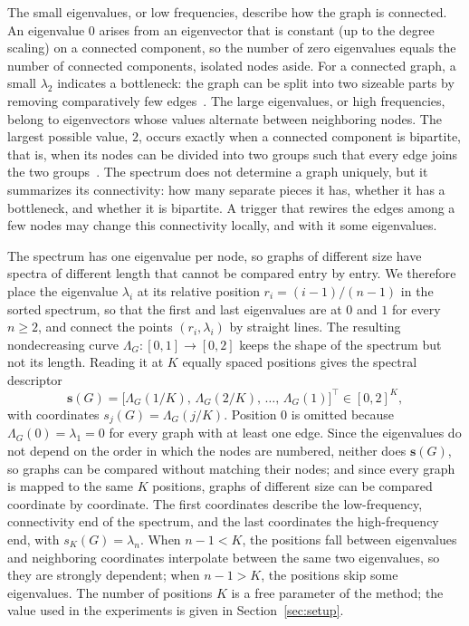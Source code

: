 \documentclass[journal]{IEEEtran}
\newcommand{\bs}{\mathbf{s}}            %
\begin{document}
The small eigenvalues, or low frequencies,
describe how the graph is connected. An eigenvalue $0$ arises from an
eigenvector that is constant (up to the degree scaling) on a connected
component, so the number of zero eigenvalues equals the number of connected
components, isolated nodes aside. For a connected graph, a small $\lambda_2$
indicates a bottleneck: the graph can be split into two sizeable parts by
removing comparatively few edges~\cite{chung1997spectral}. The large
eigenvalues, or high frequencies, belong to eigenvectors whose values alternate
between neighboring nodes. The largest possible value, $2$, occurs exactly when
a connected component is bipartite, that is, when its nodes can be divided into
two groups such that every edge joins the two
groups~\cite{chung1997spectral}. The spectrum does not determine a graph
uniquely, but it summarizes its connectivity: how many separate pieces it has,
whether it has a bottleneck, and whether it is bipartite. A trigger that
rewires the edges among a few nodes may change this connectivity locally, and
with it some eigenvalues.

The spectrum has one eigenvalue per node, so
graphs of different size have spectra of different length that cannot be
compared entry by entry. We therefore place the eigenvalue $\lambda_i$ at its
relative position $r_i=(i-1)/(n-1)$ in the sorted spectrum, so that the first
and last eigenvalues are at $0$ and $1$ for every $n\ge2$, and connect the
points $(r_i,\lambda_i)$ by straight lines. The resulting nondecreasing curve
$\Lambda_G\colon[0,1]\to[0,2]$ keeps the shape of the spectrum but not its
length. Reading it at $K$ equally spaced positions gives the spectral
descriptor
\begin{equation}
\bs(G)=\bigl[\Lambda_G(1/K),\,\Lambda_G(2/K),\,\dots,\,\Lambda_G(1)\bigr]^{\top}
\in[0,2]^{K},
\label{eq:specvec}
\end{equation}
with coordinates $s_j(G)=\Lambda_G(j/K)$. Position $0$ is omitted because
$\Lambda_G(0)=\lambda_1=0$ for every graph with at least one edge. Since the
eigenvalues do not depend on the order in which the nodes are numbered, neither
does $\bs(G)$, so graphs can be compared without matching their nodes; and
since every graph is mapped to the same $K$ positions, graphs of different
size can be compared coordinate by coordinate. The first coordinates describe
the low-frequency, connectivity end of the spectrum, and the last coordinates
the high-frequency end, with $s_K(G)=\lambda_n$. When $n-1<K$, the positions
fall between eigenvalues and neighboring coordinates interpolate between the
same two eigenvalues, so they are strongly dependent; when $n-1>K$, the
positions skip some eigenvalues. The number of positions $K$ is a free
parameter of the method; the value used in the experiments is given in
Section~\ref{sec:setup}.
\end{document}
